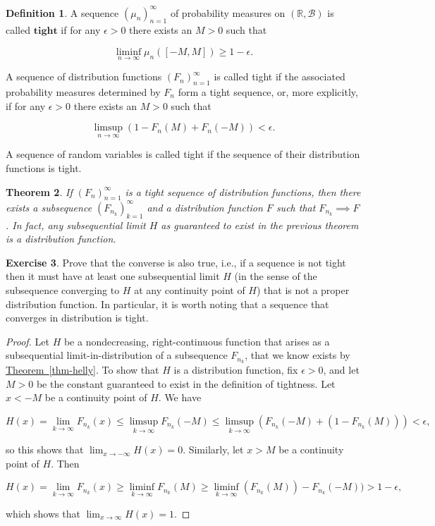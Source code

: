 \documentclass[11pt]{report}
\providecommand{\cal}{\mathcal}
\newcommand{\R}{\mathbb{R}}
\theoremstyle{plain}
\newtheorem{thm}{Theorem}[chapter]
\theoremstyle{definition}
\newtheorem{defn}[thm]{Definition}
\newtheorem{xexercise}[thm]{Exercise}
\begin{document}
\begin{defn}
A sequence $(\mu_n)_{n=1}^\infty$ of probability
measures on $(\R,{\cal B})$ is called $\textbf{tight}$
if for any $\epsilon>0$ there exists an $M>0$ such
that

\[
\liminf_{n\to\infty} \mu_n([-M,M]) \ge 1-\epsilon.
\]

\noindent A sequence of distribution functions
$(F_n)_{n=1}^\infty$ is called tight if the
associated probability measures determined by $F_n$
form a tight sequence, or, more explicitly, if for any
$\epsilon>0$ there exists an $M>0$ such that

\[
\limsup_{n\to\infty} (1-F_n(M)+F_n(-M)) < \epsilon.
\]

\noindent A sequence of random variables is called tight if the
sequence of their distribution functions is tight.
\end{defn}

\begin{thm}
If $(F_n)_{n=1}^\infty$ is a tight sequence of
distribution functions, then there exists a
subsequence $(F_{n_k})_{k=1}^\infty$ and a
distribution function $F$ such that
$F_{n_k} \implies F$. In fact, any subsequential
limit $H$ as guaranteed to exist in the previous
theorem is a distribution function.
\end{thm}

\begin{xexercise}
Prove that the converse is also true, i.e., if a
sequence is not tight then it must have at least one
subsequential limit $H$ (in the sense of the
subsequence converging to $H$ at any continuity point
of $H$) that is not a proper distribution function.
In particular, it is worth noting that a sequence that
converges in distribution is tight.
\end{xexercise}

\begin{proof}
Let $H$ be a nondecreasing, right-continuous function
that arises as a subsequential limit-in-distribution
of a subsequence $F_{n_k}$, that we know exists by
\hyperref[thm-helly]{Theorem~\ref*{thm-helly}}. To show that $H$ is a
distribution function, fix $\epsilon>0$, and let $M>0$
be the constant guaranteed to exist in the definition
of tightness. Let $x<-M$ be a continuity point of $H$.
We have

\[
H(x)=\lim_{k\to\infty} F_{n_k}(x) \le \limsup_{k\to\infty} F_{n_k}(-M) \le \limsup_{k\to\infty} (F_{n_k}(-M)+(1-F_{n_k}(M)) ) < \epsilon,
\]

\noindent so this shows that $\lim_{x\to-\infty} H(x) = 0.$
Similarly, let $x>M$ be a continuity point of $H$.
Then

\[
H(x)=\lim_{k\to\infty} F_{n_k}(x) \ge \liminf_{k\to\infty} F_{n_k}(M) \ge \liminf_{k\to\infty} (F_{n_k}(M))-F_{n_k}(-M) ) > 1-\epsilon,
\]

\noindent which shows that $\lim_{x\to\infty} H(x)=1.$
\end{proof}
\end{document}
